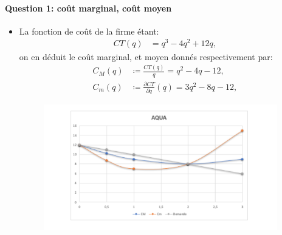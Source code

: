  \begin{frame}
 [allowframebreaks]{\insertsection}
 \framesubtitle{Question 1: coût marginal, coût moyen}
 \begin{itemize}
 \item La fonction de coût de la firme étant:
 \begin{align}
 CT(q) &= q^3 - 4q^2 + 12q,
 \label{eq13}
 \end{align}
 on en déduit le coût marginal, et moyen donnés respectivement par:
 \begin{align}
 C_M(q)&\coloneqq \frac{CT(q)}{q} = q^2 - 4q - 12,\\
 C_m(q)&\coloneqq \frac{\partial CT}{\partial q}(q) = 3q^2 - 8q - 12,
 \label{eq14}
 \end{align}
 
 \begin{figure}
   \begin{center}
   \includegraphics[width=4in]{CMetCmfigAlexis.png}
   \end{center}
   \end{figure}
 \end{itemize}
 \end{frame}
 

